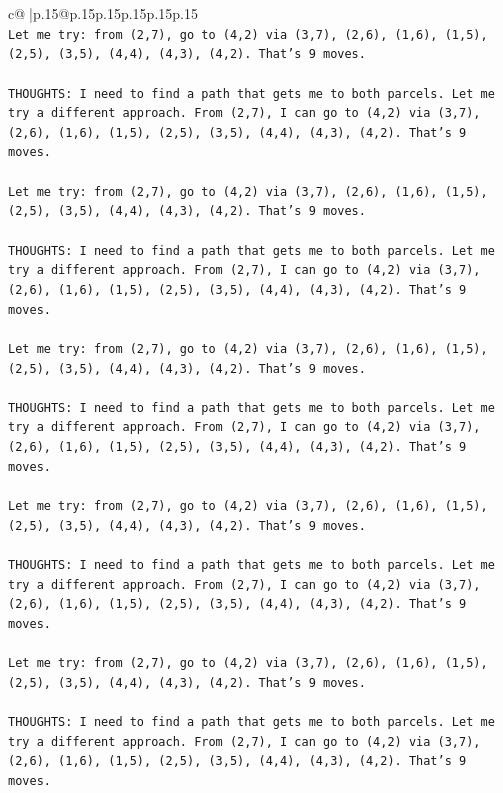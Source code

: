 \documentclass{article}
\begin{document}
{\begin{supertabular}{c@{$\;$}|p{.15\linewidth}@{}p{.15\linewidth}p{.15\linewidth}p{.15\linewidth}p{.15\linewidth}p{.15\linewidth}}
{{{\\ 
\texttt{Let me try: from (2,7), go to (4,2) via (3,7), (2,6), (1,6), (1,5), (2,5), (3,5), (4,4), (4,3), (4,2). That's 9 moves.} \\
\\ 
\texttt{THOUGHTS: I need to find a path that gets me to both parcels. Let me try a different approach. From (2,7), I can go to (4,2) via (3,7), (2,6), (1,6), (1,5), (2,5), (3,5), (4,4), (4,3), (4,2). That's 9 moves.} \\
\\ 
\texttt{Let me try: from (2,7), go to (4,2) via (3,7), (2,6), (1,6), (1,5), (2,5), (3,5), (4,4), (4,3), (4,2). That's 9 moves.} \\
\\ 
\texttt{THOUGHTS: I need to find a path that gets me to both parcels. Let me try a different approach. From (2,7), I can go to (4,2) via (3,7), (2,6), (1,6), (1,5), (2,5), (3,5), (4,4), (4,3), (4,2). That's 9 moves.} \\
\\ 
\texttt{Let me try: from (2,7), go to (4,2) via (3,7), (2,6), (1,6), (1,5), (2,5), (3,5), (4,4), (4,3), (4,2). That's 9 moves.} \\
\\ 
\texttt{THOUGHTS: I need to find a path that gets me to both parcels. Let me try a different approach. From (2,7), I can go to (4,2) via (3,7), (2,6), (1,6), (1,5), (2,5), (3,5), (4,4), (4,3), (4,2). That's 9 moves.} \\
\\ 
\texttt{Let me try: from (2,7), go to (4,2) via (3,7), (2,6), (1,6), (1,5), (2,5), (3,5), (4,4), (4,3), (4,2). That's 9 moves.} \\
\\ 
\texttt{THOUGHTS: I need to find a path that gets me to both parcels. Let me try a different approach. From (2,7), I can go to (4,2) via (3,7), (2,6), (1,6), (1,5), (2,5), (3,5), (4,4), (4,3), (4,2). That's 9 moves.} \\
\\ 
\texttt{Let me try: from (2,7), go to (4,2) via (3,7), (2,6), (1,6), (1,5), (2,5), (3,5), (4,4), (4,3), (4,2). That's 9 moves.} \\
\\ 
\texttt{THOUGHTS: I need to find a path that gets me to both parcels. Let me try a different approach. From (2,7), I can go to (4,2) via (3,7), (2,6), (1,6), (1,5), (2,5), (3,5), (4,4), (4,3), (4,2). That's 9 moves.} \\
\\ 
}}}
\end{supertabular}}
\end{document}
